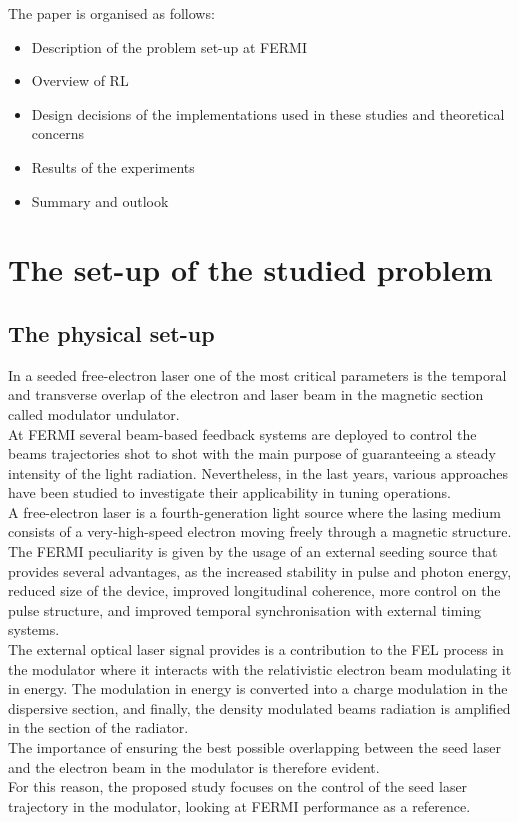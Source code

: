 \documentclass[
reprint,
amsmath,amssymb,amsfonts,clevref,
aps,
prstab,
]{revtex4-2}
\begin{document}
	The paper is organised as follows:
	\begin{itemize}
		\item Description of the problem set-up at FERMI
		\item Overview of RL
		\item Design decisions of the implementations used in these studies and theoretical concerns
		\item Results of the experiments 
		\item Summary and outlook
	\end{itemize}
	
	
	\section{The set-up of the studied problem}
	\subsection{The physical set-up}
	In a seeded free-electron laser one of the most critical parameters is the temporal and transverse overlap of the electron and laser beam in the magnetic section called modulator undulator.\\
	At FERMI several beam-based feedback systems are deployed to control the beams trajectories shot to shot with the main purpose of guaranteeing a steady intensity of the light radiation. Nevertheless, in the last years, various approaches have been studied to investigate their applicability in tuning operations. \\
	A free-electron laser is a fourth-generation light source where the lasing medium consists of a very-high-speed electron moving freely through a magnetic structure. The FERMI peculiarity is given by the usage of an external seeding source that provides several advantages, as the increased stability in pulse and photon energy, reduced size of the device, improved longitudinal coherence, more control on the pulse structure, and improved temporal synchronisation with external timing systems.\\
	The external optical laser signal provides is a contribution to the FEL process in the modulator where it interacts with the relativistic electron beam modulating it in energy. The modulation in energy is converted into a charge modulation in the dispersive section, and finally, the density modulated beams radiation is amplified in the section of the radiator.\\
	 The importance of ensuring the best possible overlapping between the seed laser and the electron beam in the modulator is therefore evident.\\
	For this reason, the proposed study focuses on the control of the seed laser trajectory in the modulator, looking at FERMI performance as a reference.
\end{document}
